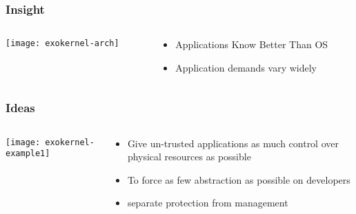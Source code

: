 \begin{frame}[plain]
	\frametitle{Insight}
	
	
	
	\begin{columns}
		
		\begin{column}{.5\textwidth}
			
			\texttt{[image: exokernel-arch]}
			
		\end{column}
		
		\begin{column}{.6\textwidth}
			
						\Large
			\begin{itemize}
				\item Applications Know Better Than OS
				\item Application demands vary widely

			\end{itemize}	
		\end{column}
		
		
	\end{columns}
	
\end{frame}



\begin{frame}[plain]
	\frametitle{Ideas}
	
	
	
	\begin{columns}
		
		\begin{column}{.5\textwidth}
			
			\texttt{[image: exokernel-example1]}
			
		\end{column}
		
		\begin{column}{.5\textwidth}
			
			\begin{itemize}
				\item Give un-trusted applications as much control over physical resources as possible
				\item To force as few abstraction as possible on developers
				\item separate protection from management
				
			\end{itemize}	
		\end{column}
		
		
	\end{columns}
	
\end{frame}



